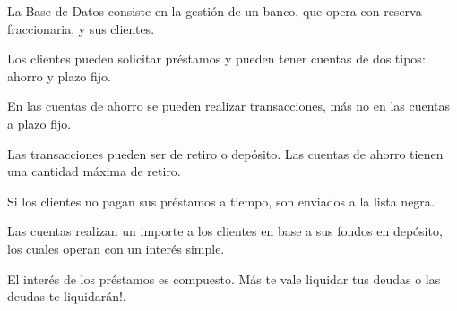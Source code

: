 La Base de Datos consiste en la gestión de un banco, que opera con reserva fraccionaria, y sus clientes.

Los clientes pueden solicitar préstamos y pueden tener cuentas de dos tipos: ahorro y plazo fijo.

En las cuentas de ahorro se pueden realizar transacciones, más no en las cuentas a plazo fijo.

Las transacciones pueden ser de retiro o depósito. Las cuentas de ahorro tienen una cantidad máxima de retiro.

Si los clientes no pagan sus préstamos a tiempo, son enviados a la lista negra.

Las cuentas realizan un importe a los clientes en base a sus fondos en depósito, los cuales operan con un interés simple.

El interés de los préstamos es compuesto. Más te vale liquidar tus deudas o las deudas te liquidarán!.